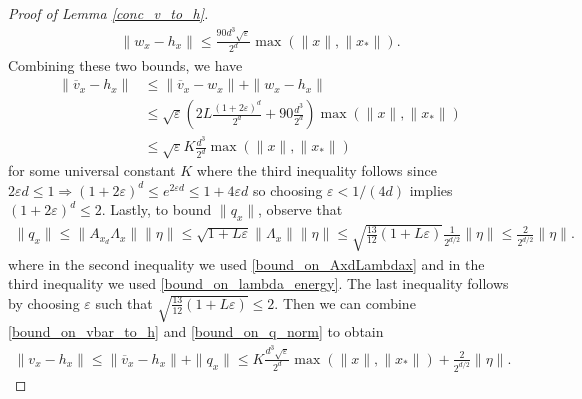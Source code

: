 \documentclass[11pt]{article}
\renewcommand{\epsilon}{\varepsilon}
\theoremstyle{remark}
\begin{document}
\begin{proof}[Proof of Lemma \ref{conc_v_to_h}]
\begin{align*}
    \|w_x - h_x\| \leqslant \frac{90d^3\sqrt{\epsilon}}{2^d}\max(\|x\|,\|x_*\|).
\end{align*} Combining these two bounds, we have \begin{align}
\|\overline{v}_{x} - h_{x}\| & \leqslant \|\overline{v}_x - w_x\| + \|w_x - h_{x}\| \nonumber\\
& \leqslant \sqrt{\epsilon}\left(2L \frac{(1 + 2\epsilon)^d}{2^d} + 90\frac{d^3}{2^d}\right)\max(\|x\|,\|x_*\|) \nonumber\\
& \leqslant \sqrt{\epsilon}K \frac{d^3}{2^d}\max(\|x\|,\|x_*\|) \label{bound_on_vbar_to_h}
\end{align} for some universal constant $K$ where the third inequality follows since $2\epsilon d \leqslant 1 \Longrightarrow (1 + 2\epsilon)^d \leqslant e^{2\epsilon d} \leqslant 1 + 4\epsilon d$ so choosing $\epsilon < 1/(4d)$ implies $(1+2\epsilon)^d\leqslant2$. Lastly, to bound $\|q_x\|$, observe that \begin{align}
    \|q_x\| \leqslant \|A_{x_d}\Lambda_x\|\|\eta\| \leqslant \sqrt{1 + L\epsilon}\|\Lambda_x\|\|\eta\| \leqslant \sqrt{\frac{13}{12}(1+ L\epsilon)}\frac{1}{2^{d/2}} \|\eta\| \leqslant \frac{2}{2^{d/2}}\|\eta\|. \label{bound_on_q_norm}
\end{align} where in the second inequality we used \eqref{bound_on_AxdLambdax} and in the third inequality we used \eqref{bound_on_lambda_energy}. The last inequality follows by choosing $\epsilon$ such that $\sqrt{\frac{13}{12}(1+L\epsilon)}\leqslant2$. Then we can combine \eqref{bound_on_vbar_to_h} and \eqref{bound_on_q_norm} to obtain \begin{align*}
    \|v_x - h_x\| \leqslant \|\overline{v}_x - h_x\| + \|q_x\| \leqslant K \frac{d^3\sqrt{\epsilon}}{2^d}\max(\|x\|,\|x_*\|) + \frac{2}{2^{d/2}}\|\eta\|.
\end{align*} 


\end{proof}
\end{document}
